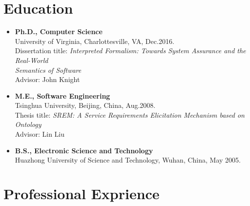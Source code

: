 \documentclass[11pt]{article}
\begin{document}


\section{Education}

\begin{itemize}
  \item \textbf{Ph.D., Computer Science} \\
\phantom{\qquad} University of Virginia, Charlottesville, VA, Dec.2016. \\
\phantom{\qquad} Dissertation title: \emph{Interpreted Formalism: Towards System Assurance and the Real-World}\\
\phantom{\qquad} \emph{Semantics of Software} \\
\phantom{\qquad} Advisor: John Knight
   \item \textbf{M.E., Software Engineering} \\
\phantom{\qquad} Tsinghua University, Beijing, China, Aug.2008. \\
\phantom{\qquad} Thesis title: \emph{SREM: A Service Requirements Elicitation Mechanism based on Ontology} \\
\phantom{\qquad} Advisor: Lin Liu 
   \item \textbf{B.S., Electronic Science and Technology} \\
\phantom{\qquad} Huazhong University of Science and Technology, Wuhan, China, May 2005.
\end{itemize}



\section{Professional Exprience}

\end{document}
